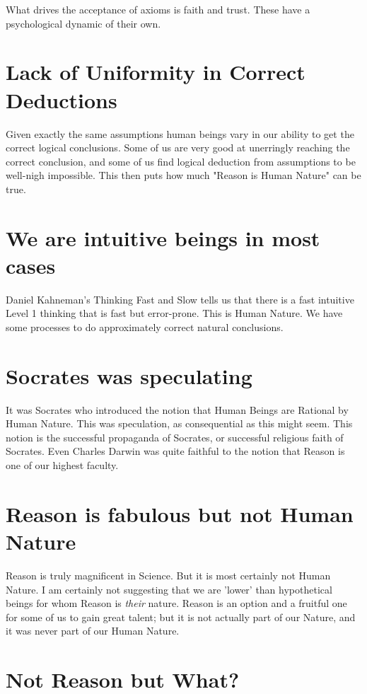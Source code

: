 \documentclass{amsart}
\begin{document}
What drives the acceptance of axioms is faith and trust.  These have a psychological dynamic of their own.

\section{Lack of Uniformity in Correct Deductions}

Given exactly the same assumptions human beings vary in our ability to get the correct logical conclusions.  Some of us are very good at unerringly reaching the correct conclusion, and some of us find logical deduction from assumptions to be well-nigh impossible.  This then puts how much "Reason is Human Nature" can be true.  

\section{We are intuitive beings in most cases}

Daniel Kahneman's Thinking Fast and Slow tells us that there is a fast intuitive Level 1 thinking that is fast but error-prone.  This is Human Nature.  We have some processes to do approximately correct natural conclusions.  

\section{Socrates was speculating}

It was Socrates who introduced the notion that Human Beings are Rational by Human Nature.  This was speculation, as consequential as this might seem.  This notion is the successful propaganda of Socrates, or successful religious faith of Socrates.  Even Charles Darwin was quite faithful to the notion that Reason is one of our highest faculty.  

\section{Reason is fabulous but not Human Nature}

Reason is truly magnificent in Science.  But it is most certainly not Human Nature.  I am certainly not suggesting that we are 'lower' than hypothetical beings for whom Reason is {\em their} nature.  Reason is an option and a fruitful one for some of us to gain great talent; but it is not actually part of our Nature, and it was never part of our Human Nature.

\section{Not Reason but What?}
\end{document}
